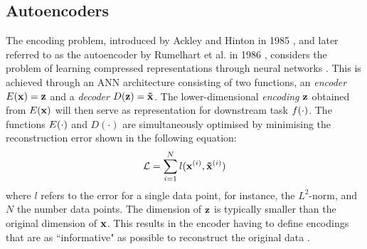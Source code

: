 \subsection{Autoencoders}
The encoding problem, introduced by Ackley and Hinton in 1985 \citep{ackleyLearningAlgorithmBoltzmann1985}, and later referred to as the autoencoder by Rumelhart et al. in 1986 \citep{rumelhartLearningInternalRepresentations1988}, considers the problem of learning compressed representations through neural networks \citep{rumelhartLearningInternalRepresentations1988, bankAutoencoders2021}. This is achieved through an ANN architecture consisting of two functions, an \textit{encoder} $E(\mathbf{x}) = \mathbf{z}$ and a \textit{decoder} $D(\mathbf{z}) = \mathbf{\tilde{x}}$.
The lower-dimensional \textit{encoding} $\mathbf{z}$ obtained from $E(\mathbf{x})$ will then serve as representation for downstream task $f(\cdot)$.
The functions $E(\cdot)$ and $D(\cdot)$ are simultaneously optimised by minimising the reconstruction error shown in the following equation:
\begin{equation}
	\mathcal{L} = \sum_{i = 1}^N l(\mathbf{x}^{(i)}, \mathbf{\tilde{x}}^{(i)})
\end{equation}
where $l$ refers to the error for a single data point, for instance, the $L^2$-norm, and $N$ the number data points. The dimension of $\mathbf{z}$ is typically smaller than the original dimension of $\mathbf{x}$. This results in the encoder having to define encodings that are as ``informative" as possible to reconstruct the original data \citep{bankAutoencoders2021}.

